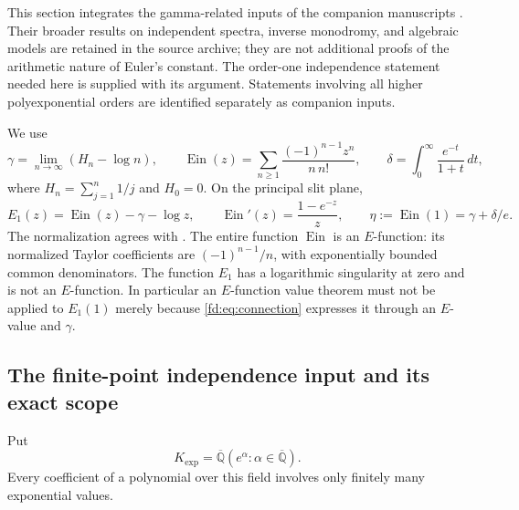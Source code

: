 \documentclass[11pt,a4paper]{article}
\newcommand{\Qbar}{\overline{\mathbb Q}}
\newcommand{\Ein}{\operatorname{Ein}}
\theoremstyle{definition}
\theoremstyle{remark}
\numberwithin{equation}{section}
\begin{document}
This section integrates the gamma-related inputs of the companion manuscripts
\cite{pm:KEIO001,pm:KEIO002}.  Their broader results on independent spectra, inverse
monodromy, and algebraic models are retained in the source archive; they are
not additional proofs of the arithmetic nature of Euler's constant.
The order-one independence statement needed here is supplied with its
argument.  Statements involving all higher polyexponential orders are
identified separately as companion inputs.

We use
\begin{equation}\label{fd:eq:definitions}
 \gamma=\lim_{n\to\infty}(H_n-\log n),\qquad
 \Ein(z)=\sum_{n\ge1}\frac{(-1)^{n-1}z^n}{n\,n!},\qquad
 \delta=\int_0^\infty\frac{e^{-t}}{1+t}\,dt,
\end{equation}
where $H_n=\sum_{j=1}^n1/j$ and $H_0=0$.  On the principal slit plane,
\begin{equation}\label{fd:eq:connection}
 E_1(z)=\Ein(z)-\gamma-\log z,\qquad
 \Ein'(z)=\frac{1-e^{-z}}z,\qquad
 \eta:=\Ein(1)=\gamma+\delta/e.
\end{equation}
The normalization agrees with \cite[\S6.2]{fd:DLMF}.
The entire function $\Ein$ is an $E$-function: its normalized Taylor
coefficients are $(-1)^{n-1}/n$, with exponentially bounded common
denominators.  The function $E_1$ has a logarithmic singularity at zero
and is not an $E$-function.  In particular an $E$-function value theorem
must not be applied to $E_1(1)$ merely because \eqref{fd:eq:connection}
expresses it through an $E$-value and $\gamma$.

\subsection{The finite-point independence input and its exact scope}
Put
\[
 K_{\exp}=\Qbar(e^\alpha:\alpha\in\Qbar).
\]
Every coefficient of a polynomial over this field involves only finitely
many exponential values.
\end{document}
